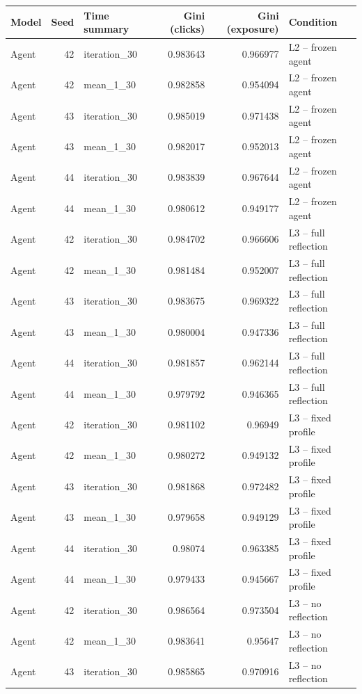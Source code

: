 \begin{table}[htbp!]
\centering
\small
\setlength{\tabcolsep}{3pt}
\renewcommand{\arraystretch}{1.1}
\begin{tabular}{lrlrrl}
\hline
Model & Seed & Time summary & Gini (clicks) & Gini (exposure) & Condition \\
\hline
Agent & 42 & iteration\_30 & 0.983643 & 0.966977 & L2 -- frozen agent \\
Agent & 42 & mean\_1\_30 & 0.982858 & 0.954094 & L2 -- frozen agent \\
Agent & 43 & iteration\_30 & 0.985019 & 0.971438 & L2 -- frozen agent \\
Agent & 43 & mean\_1\_30 & 0.982017 & 0.952013 & L2 -- frozen agent \\
Agent & 44 & iteration\_30 & 0.983839 & 0.967644 & L2 -- frozen agent \\
Agent & 44 & mean\_1\_30 & 0.980612 & 0.949177 & L2 -- frozen agent \\
Agent & 42 & iteration\_30 & 0.984702 & 0.966606 & L3 -- full reflection \\
Agent & 42 & mean\_1\_30 & 0.981484 & 0.952007 & L3 -- full reflection \\
Agent & 43 & iteration\_30 & 0.983675 & 0.969322 & L3 -- full reflection \\
Agent & 43 & mean\_1\_30 & 0.980004 & 0.947336 & L3 -- full reflection \\
Agent & 44 & iteration\_30 & 0.981857 & 0.962144 & L3 -- full reflection \\
Agent & 44 & mean\_1\_30 & 0.979792 & 0.946365 & L3 -- full reflection \\
Agent & 42 & iteration\_30 & 0.981102 & 0.96949 & L3 -- fixed profile \\
Agent & 42 & mean\_1\_30 & 0.980272 & 0.949132 & L3 -- fixed profile \\
Agent & 43 & iteration\_30 & 0.981868 & 0.972482 & L3 -- fixed profile \\
Agent & 43 & mean\_1\_30 & 0.979658 & 0.949129 & L3 -- fixed profile \\
Agent & 44 & iteration\_30 & 0.98074 & 0.963385 & L3 -- fixed profile \\
Agent & 44 & mean\_1\_30 & 0.979433 & 0.945667 & L3 -- fixed profile \\
Agent & 42 & iteration\_30 & 0.986564 & 0.973504 & L3 -- no reflection \\
Agent & 42 & mean\_1\_30 & 0.983641 & 0.95647 & L3 -- no reflection \\
Agent & 43 & iteration\_30 & 0.985865 & 0.970916 & L3 -- no reflection \\

\end{tabular}
\end{table}
